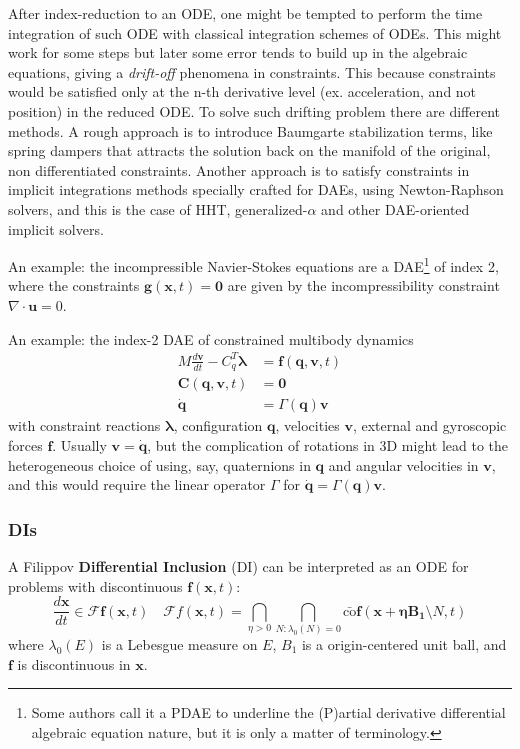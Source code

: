 \documentclass{digitaldynamics}
\def\vect#1{\bm{#1}}
\def\matr#1{{#1}}
\begin{document}
After index-reduction to an ODE, one might be tempted to perform the time integration of such ODE with classical integration schemes of ODEs. This might work for some steps but later some error tends to build up in the algebraic equations, giving a \textit{drift-off} phenomena in constraints. This because constraints would be satisfied only at the n-th derivative level (ex. acceleration, and not position) in the reduced ODE. To solve such drifting problem there are different methods. A rough approach is to introduce Baumgarte stabilization terms, like spring dampers that attracts the solution back on the manifold of the original, non differentiated constraints. Another approach is to satisfy constraints in implicit integrations methods specially crafted for DAEs, using Newton-Raphson solvers, and this is the case of HHT, generalized-$\alpha$ and other DAE-oriented implicit solvers.

An example: the incompressible Navier-Stokes equations are a DAE\footnote{Some authors call it a PDAE
to underline the (P)artial derivative differential algebraic equation nature, but it is only a matter of
terminology.} of index 2, where the constraints $\vect{g}(\vect{x},t) = \vect{0}$ are given
by the incompressibility constraint $\nabla \cdot \vect{u}=0$. 

An example: the index-2 DAE of constrained multibody dynamics
%
\begin{align}
  \matr{M} \frac{d\vect{\vect{v}}}{dt} - \matr{C}_q^T \vect{\lambda}  &= \vect{f} \left( \vect{q},\vect{v}, t \right)   \\
	\vect{C}(\vect{q},\vect{v},t) &=\vect{0} \\
	\dot{\vect{q}} &= \Gamma(\vect{q}) \vect{v}
	\label{eq:daemechanics}
\end{align}
%
with constraint reactions $\vect{\lambda}$, configuration $\vect{q}$, velocities $\vect{v}$, external and gyroscopic forces $\vect{f}$. 
Usually $\vect{v}=\dot{\vect{q}}$, but the complication of rotations in 3D might lead to the heterogeneous choice of using, say, quaternions in $\vect{q}$ and
angular velocities in $\vect{v}$, and this would require the linear operator $\Gamma$ for $\dot{\vect{q}} = \Gamma(\vect{q}) \vect{v}$.

\subsubsection{DIs}

A Filippov \textbf{Differential Inclusion} (DI) can be interpreted as an ODE 
for problems with discontinuous $\vect{f}(\vect{x},t)$:
\begin{equation}
\label{eq:FilippovDI}
\frac{d\vect{x}}{dt} \in \mathcal{F}\vect{f}(\vect{x},t) 
\quad
 \mathcal{F}f(\vect{x},t) = \bigcap_{\eta > 0} \bigcap_{N:\lambda_0(N)=0}
  \bar{\mathrm{co}} \vect{f}(\vect{x+\eta B_1}\setminus N,t)
\end{equation}
where $\lambda_0(E)$ is a Lebesgue measure on $E$, $B_1$ is a origin-centered 
unit ball, and $\vect{f}$ is discontinuous in $\vect{x}$. 
\end{document}
